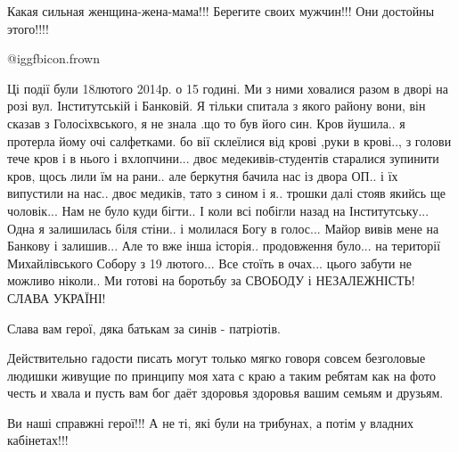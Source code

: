  
 
 
 
 


Какая сильная женщина-жена-мама!!! Берегите своих мужчин!!! Они достойны этого!!!!

 @igg{fbicon.frown} 


Ці події були 18лютого 2014р. о 15 годині. Ми з ними ховалися разом в дворі на
розі вул. Інститутській і Банковій. Я тільки спитала з якого району вони, він
сказав з Голосіхвського, я не знала .що то був його син. Кров йушила.. я
протерла йому очі салфетками. бо вії склеїлися від крові ,руки в крові.., з
голови тече кров і в нього і вхлопчини... двоє медекивів-студентів старалися
зупинити кров, щось лили їм на рани.. але беркутня бачила нас із двора ОП.. і їх
випустили на нас.. двоє медиків, тато з сином і я.. трошки далі стояв якийсь ще
чоловік... Нам не було куди бігти.. І коли всі побігли назад на
Інститутську... Одна я залишилась біля стіни.. і молилася Богу в голос... Майор
вивів мене на Банкову і залишив... Але то вже інша історія.. продовження
було... на території Михайлівського Собору з 19 лютого... Все стоїть в
очах... цього забути не можливо ніколи.. Ми готові на боротьбу за СВОБОДУ і
НЕЗАЛЕЖНІСТЬ! СЛАВА УКРАЇНІ!


Слава вам герої, дяка батькам за синів - патріотів.


Действительно гадости писать могут только мягко говоря совсем безголовые
людишки живущие по принципу моя хата с краю а таким ребятам как на фото честь и
хвала и пусть вам бог даёт здоровья здоровья вашим семьям и друзьям.


Ви наші справжні герої!!! А не ті, які були на трибунах, а потім у владних кабінетах!!!


